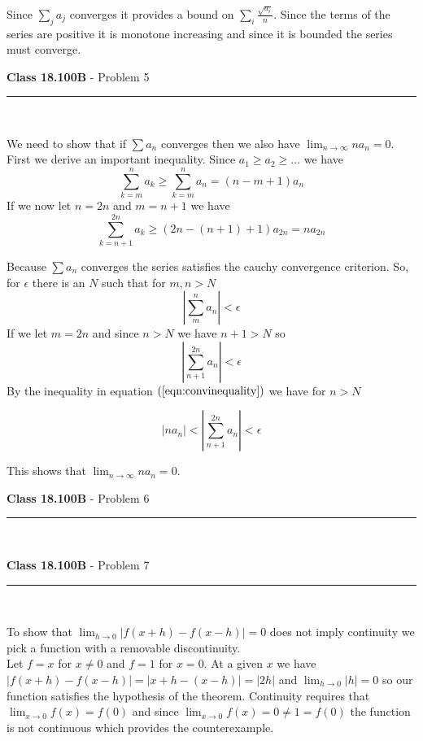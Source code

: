\documentclass[11pt,reqno]{article}
\begin{document}
\noindent Since $\sum_j a_j$ converges it provides a bound on $\sum_i \frac{\sqrt{a_i}}{n}$. Since the terms of the series are positive it is monotone increasing and since it is bounded the series must converge.

\vspace{15pt}
\begin{flushleft} 
\textbf{Class 18.100B} - Problem 5\\
\rule{500pt}{1pt}\\
\end{flushleft} 

We need to show that if $\sum a_n$ converges then we also have $\lim_{n \to \infty} na_n = 0$. First we derive an important inequality. Since $a_1 \ge a_2 \ge ...$ we have 
\[ \sum_{k = m}^n a_k \ge \sum_{k = m}^n a_n = (n-m+1)a_n \] 
If we now let $n = 2n$ and  $m = n+1$ we have 
\begin{equation}
 \sum_{k = n+1}^{2n} a_k \ge (2n - (n+1) + 1)a_{2n} =  na_{2n} \label{eqn:convinequality}
\end{equation}

 Because $\sum a_n$ converges the series satisfies the cauchy convergence criterion. So, for $\epsilon$ there is an $N$ such that for $m,n > N$ 
\[ |\sum_m^n a_n| < \epsilon \]
If we let $m = 2n$ and since $n >N$ we have $n+1 > N$ so  
\[ |\sum_{n+1}^{2n} a_n| < \epsilon \]
By the inequality in equation $(\ref{eqn:convinequality})$ we have for $n > N$

\[ |na_n| <  |\sum_{n+1}^{2n} a_n| < \epsilon \]

\noindent This shows that $\lim_{n \to \infty} na_n = 0$.

\vspace{15pt}
\begin{flushleft} 
\textbf{Class 18.100B} - Problem 6\\
\rule{500pt}{1pt}\\
\end{flushleft} 


\vspace{15pt}
\begin{flushleft} 
\textbf{Class 18.100B} - Problem 7\\
\rule{500pt}{1pt}\\
\end{flushleft} 

To show that $\lim_{h \to 0} |f(x+h) - f(x-h)| = 0$ does not imply continuity we pick a function with a removable discontinuity.\\
\indent Let $f = x$ for $x \neq 0$ and $f = 1$ for $x = 0$. At a given $x$ we have $|f(x+h) - f(x-h)| = |x+h - (x-h)| = |2h|$ and $\lim_{h \to 0} |h| = 0$ so our function satisfies the hypothesis of the theorem. Continuity requires that $\lim_{x \to 0}f(x) = f(0)$ and since $\lim_{x \to 0}f(x)  = 0 \neq 1 = f(0)$ the function is not continuous which provides the counterexample.


\end{document}

